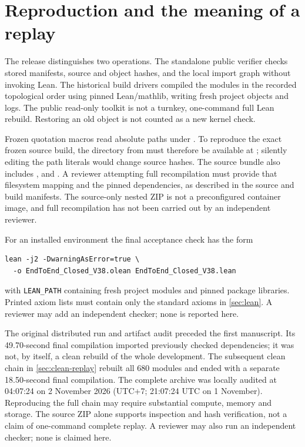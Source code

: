 \documentclass[11pt,a4paper]{article}
\theoremstyle{definition}
\newcommand{\code}[1]{\texttt{#1}}
\begin{document}
\section{Reproduction and the meaning of a replay}\label{app:replay}
The release distinguishes two operations. The standalone public verifier checks stored manifests, source and object hashes, and the local import graph without invoking Lean. The historical build drivers compiled the modules in the recorded topological order using pinned Lean/mathlib, writing fresh project objects and logs. The public read-only toolkit is not a turnkey, one-command full Lean rebuild. Restoring an old object is not counted as a new kernel check.

Frozen quotation macros read absolute paths under . To reproduce the exact frozen source build, the  directory from  must therefore be available at ; silently editing the path literals would change source hashes. The source bundle also includes ,  and . A reviewer attempting full recompilation must provide that filesystem mapping and the pinned dependencies, as described in the source and build manifests. The source-only nested ZIP is not a preconfigured container image, and full recompilation has not been carried out by an independent reviewer.

For an installed environment the final acceptance check has the form
\begin{lstlisting}
lean -j2 -DwarningAsError=true \
  -o EndToEnd_Closed_V38.olean EndToEnd_Closed_V38.lean
\end{lstlisting}
with \code{LEAN\_PATH} containing fresh project modules and pinned package libraries. Printed axiom lists must contain only the standard axioms in \cref{sec:lean}. A reviewer may add an independent checker; none is reported here.

The original distributed run and artifact audit preceded the first manuscript. Its 49.70-second final compilation imported previously checked dependencies; it was not, by itself, a clean rebuild of the whole development. The subsequent clean chain in \cref{sec:clean-replay} rebuilt all 680 modules and ended with a separate 18.50-second final compilation. The complete archive was locally audited at 04:07:24 on 2 November 2026 (UTC+7; 21:07:24 UTC on 1 November). Reproducing the full chain may require substantial compute, memory and storage. The source ZIP alone supports inspection and hash verification, not a claim of one-command complete replay. A reviewer may also run an independent checker; none is claimed here.
\printbibliography
\end{document}
